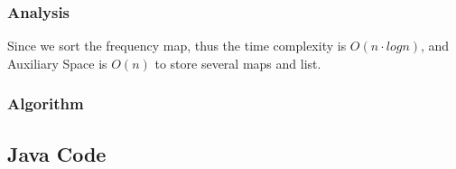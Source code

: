 \documentclass[]{book}
\begin{document}
\hypertarget{analysis-25}{%
\subsubsection{Analysis}\label{analysis-25}}

Since we sort the frequency map, thus the time complexity is \(O(n \cdot log n)\), and Auxiliary Space is \(O(n)\) to
store several maps and list.

\hypertarget{algorithm-25}{%
\subsubsection{Algorithm}\label{algorithm-25}}

\hypertarget{java-code-21}{%
\subsection{Java Code}\label{java-code-21}}
\end{document}
